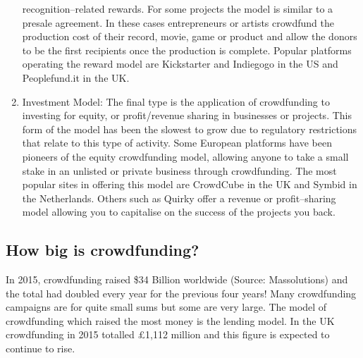 \begin{enumerate}
          recognition–related rewards. For some projects the model is similar to a presale agreement.
          In these cases entrepreneurs or artists crowdfund the production cost of their record, movie,
          game or product and allow the donors to be the first recipients once the production is
          complete. Popular platforms operating the reward model are Kickstarter and Indiegogo in the
          US and Peoplefund.it in the UK.
    \item Investment Model:
          The final type is the application of crowdfunding to investing for equity, or
          profit/revenue sharing in businesses or projects. This form of the model has been the slowest
          to grow due to regulatory restrictions that relate to this type of activity. Some European
          platforms have been pioneers of the equity crowdfunding model, allowing anyone to take a
          small stake in an unlisted or private business through crowdfunding. The most popular sites in
          offering this model are CrowdCube in the UK and Symbid in the Netherlands. Others such as
          Quirky offer a revenue or profit–sharing model allowing you to capitalise on the success of the
          projects you back.
\end{enumerate}


\subsection*{ How big is crowdfunding? }
In 2015, crowdfunding raised \$34 Billion worldwide (Source: Massolutions) and the total
had doubled every year for the previous four years! Many crowdfunding campaigns are
for quite small sums but some are very large. The model of crowdfunding which raised
the most money is the lending model. In the UK crowdfunding in 2015 totalled £1,112
million and this figure is expected to continue to rise.


